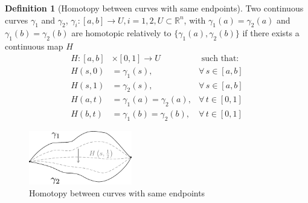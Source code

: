 \documentclass[a4paper,11pt,titlepage, article, oneside]{memoir}
\numberwithin{equation}{section}
\theoremstyle{definition}
\newtheorem{definition}[theorem]{Definition}
\theoremstyle{remark}
\newcommand{\rfield}{\mathbb{R}}
\begin{document}
\begin{definition}[Homotopy between curves with same endpoints]
  Two continuous curves $\gamma_1$ and $\gamma_2$, $\gamma_i \colon [a, b] \rightarrow U, i=1,2, U \subset \rfield^n$, with $\gamma_1(a) = \gamma_2(a)$ and $\gamma_1(b) = \gamma_2(b)$ are homotopic relatively to $\{\gamma_1(a), \gamma_2(b)\}$ if there exists a continuous map $H$
  \begin{align*}
    H \colon [a, b] &\times [0, 1] \rightarrow U &\text{ such that:}\\
    H(s, 0) &= \gamma_1(s), &\forall\, s \in [a, b] \\
    H(s, 1) &= \gamma_2(s), &\forall\, s \in [a, b] \\
    H(a, t) &= \gamma_1(a) = \gamma_2(a), &\forall\, t \in [0, 1] \\
    H(b, t) &= \gamma_1(b) = \gamma_2(b), &\forall\, t \in [0, 1]
  \end{align*}
  \begin{figure}[H] \label{Fig:hom2}
     \centering
     \includegraphics[width=0.4\textwidth]{Images/homotopy2.pdf}
     \caption{Homotopy between curves with same endpoints}
\end{figure}
\end{definition}
\end{document}
